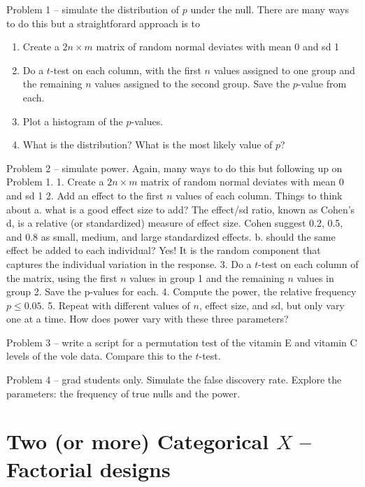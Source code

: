 \documentclass[]{book}
\providecommand{\tightlist}{%
  \setlength{\itemsep}{0pt}\setlength{\parskip}{0pt}}
\begin{document}
Problem 1 -- simulate the distribution of \(p\) under the null. There
are many ways to do this but a straightforard approach is to

\begin{enumerate}
\def\labelenumi{\arabic{enumi}.}
\tightlist
\item
  Create a \(2n \times m\) matrix of random normal deviates with mean 0
  and sd 1
\item
  Do a \(t\)-test on each column, with the first \(n\) values assigned
  to one group and the remaining \(n\) values assigned to the second
  group. Save the \(p\)-value from each.
\item
  Plot a histogram of the \(p\)-values.
\item
  What is the distribution? What is the most likely value of \(p\)?
\end{enumerate}

Problem 2 -- simulate power. Again, many ways to do this but following
up on Problem 1. 1. Create a \(2n \times m\) matrix of random normal
deviates with mean 0 and sd 1 2. Add an effect to the first \(n\) values
of each column. Things to think about a. what is a good effect size to
add? The effect/sd ratio, known as Cohen's d, is a relative (or
standardized) measure of effect size. Cohen suggest 0.2, 0.5, and 0.8 as
small, medium, and large standardized effects. b. should the same effect
be added to each individual? Yes! It is the random component that
captures the individual variation in the response. 3. Do a \(t\)-test on
each column of the matrix, using the first \(n\) values in group 1 and
the remaining \(n\) values in group 2. Save the p-values for each. 4.
Compute the power, the relative frequency \(p \le 0.05\). 5. Repeat with
different values of \(n\), effect size, and sd, but only vary one at a
time. How does power vary with these three parameters?

Problem 3 -- write a script for a permutation test of the vitamin E and
vitamin C levels of the vole data. Compare this to the \(t\)-test.

Problem 4 -- grad students only. Simulate the false discovery rate.
Explore the parameters: the frequency of true nulls and the power.

\chapter{\texorpdfstring{Two (or more) Categorical \(X\) -- Factorial
designs}{Two (or more) Categorical X -- Factorial designs}}\label{two-or-more-categorical-x-factorial-designs}
\end{document}

